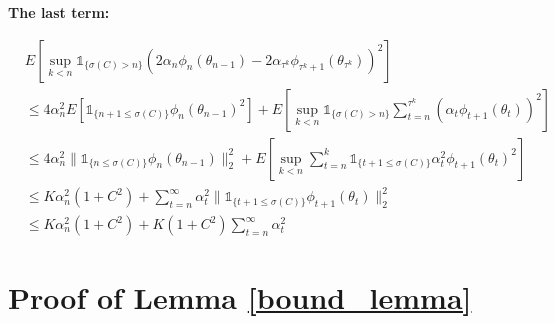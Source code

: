 \documentclass[11pt]{article}
\begin{document}
{\bf The last term:} 

\begin{align*}
&E\left[ \sup_{k<n}\mathds{1}_{\{\sigma(C)>n\}}\left(2\alpha_n \phi_n(\theta_{n-1}) - 2\alpha_{\tau^k} \phi_{\tau^k+1}(\theta_{\tau^k})\right)^2 \right]\\
&\leq 4\alpha_n^2 E\left[\mathds{1}_{\{n+1\leq \sigma(C)\}}\phi_n(\theta_{n-1})^2\right] + E\left[ \sup_{k<n}\mathds{1}_{\{\sigma(C)>n\}} \sum_{t=n}^{\tau^k}(\alpha_t \phi_{t+1}(\theta_t))^2\right]\\
&\leq  4\alpha_n^2 \|\mathds{1}_{\{n\leq \sigma(C)\}}\phi_n(\theta_{n-1})\|_2^2+  E\left[ \sup_{k<n}\sum_{t=n}^k \mathds{1}_{\{t+1\leq \sigma(C)\}}\alpha_t^2 \phi_{t+1}(\theta_t)^2\right]\\
&\leq K \alpha_n^2 (1+C^2) + \sum_{t=n}^\infty \alpha_t^2 \|  \mathds{1}_{\{t+1\leq \sigma(C)\}}  \phi_{t+1}(\theta_t)\|_2^2 \\
&\leq K \alpha_n^2 (1+C^2) + K  (1+C^2) \sum_{t=n}^\infty \alpha_t^2
\end{align*}


\section{Proof of Lemma \ref{bound_lemma}}\label{bound_lemma_proof}
\end{document}
